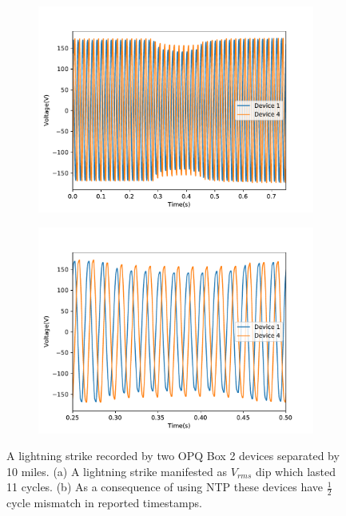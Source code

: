 \begin{figure}[h]
		\centering
	\begin{subfigure}{.5\textwidth}
	  \centering
	  \includegraphics[width=0.9\linewidth]{img/voltage_sag.pdf}
	  \caption{}
	  \label{fig:opq:6:1}
	\end{subfigure}%
	\begin{subfigure}{.5\textwidth}
	  \centering
	  \includegraphics[width=0.9\linewidth]{img/voltage_sag_zoomed_in.pdf}
	  \caption{}
	  \label{fig:opq:6:2}
	\end{subfigure}
	\caption{A lightning strike recorded by two OPQ Box 2 devices separated by 10 miles. (a) A lightning strike manifested as $V_{rms}$ dip which lasted 11 cycles. (b) As a consequence of using NTP these devices have $\frac{1}{2}$ cycle mismatch in reported timestamps.}
	\label{fig:opq:6}
\end{figure}


